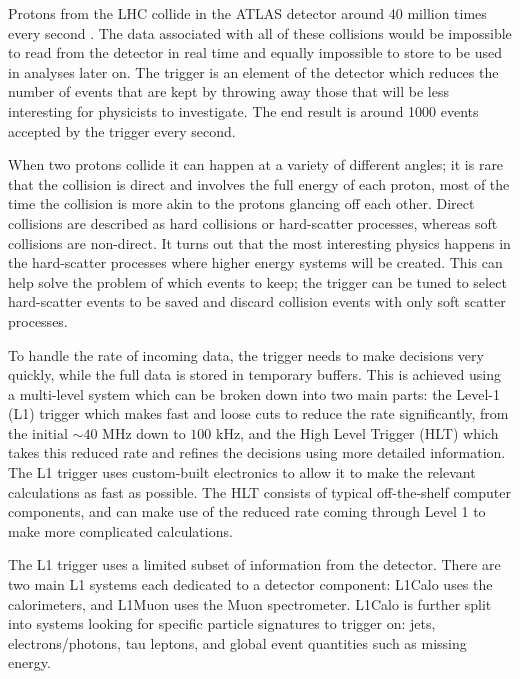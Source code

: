 Protons from the LHC collide in the ATLAS detector around 40 million times every
second \cite{ATLAS2020a}.
The data associated with all of these collisions would be impossible to read from the detector
in real time and equally impossible to store to be used in analyses later on.
The trigger is an element of the detector which reduces the number of events that are
kept by throwing away those that will be less interesting for physicists to investigate.
The end result is around 1000 events accepted by the trigger every second.

When two protons collide it can happen at a variety of different angles; it is rare
that the collision is direct and involves the full energy of each proton, most of the time
the collision is more akin to the protons glancing off each other. Direct collisions are
described as hard collisions or hard-scatter processes, whereas soft collisions
are non-direct. It turns out that the most interesting physics happens in the hard-scatter
processes where higher energy systems will be created. This can help solve the problem of
which events to keep; the trigger can be tuned to select hard-scatter events to be saved
and discard collision events with only soft scatter processes.

To handle the rate of incoming data, the trigger needs to make decisions very quickly,
while the full data is stored in temporary buffers.
This is achieved using a multi-level system which can be broken down into two main parts:
the Level-1 (L1) trigger which makes fast and loose cuts to reduce the rate significantly,
from the initial $\sim40$ MHz down to $100$ kHz,
and the High Level Trigger (HLT) which takes this reduced rate
and refines the decisions using more detailed information. The L1 trigger uses
custom-built electronics to allow it to make the relevant calculations as fast as
possible. The HLT consists of typical off-the-shelf computer components, and can make use
of the reduced rate coming through Level 1 to make more complicated calculations.

The L1 trigger uses a limited subset of information from the detector. There are two main L1
systems each dedicated to a detector component: L1Calo uses the calorimeters, and L1Muon
uses the Muon spectrometer. L1Calo is further split into systems looking for specific
particle signatures to trigger on: jets, electrons/photons, tau leptons, and global event quantities
such as missing energy.

